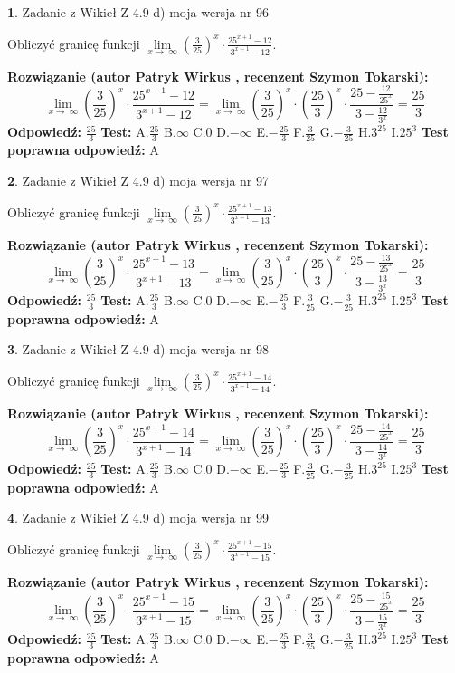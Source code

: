 \documentclass[12pt, a4paper]{article}
\theoremstyle{definition} %
\newtheorem{zad}{}
\newcommand{\zadStart}[1]{\begin{zad}#1\newline}
\newcommand{\zadStop}{\end{zad}}
\newcommand{\rozwStart}[2]{\noindent \textbf{Rozwiązanie (autor #1 , recenzent #2): }\newline}
\newcommand{\rozwStop}{\newline}
\newcommand{\odpStart}{\noindent \textbf{Odpowiedź:}\newline}
\newcommand{\odpStop}{\newline}
\newcommand{\testStart}{\noindent \textbf{Test:}\newline}
\newcommand{\testStop}{\newline}
\newcommand{\kluczStart}{\noindent \textbf{Test poprawna odpowiedź:}\newline}
\newcommand{\kluczStop}{\newline}
\begin{document}
\zadStart{Zadanie z Wikieł Z 4.9 d) moja wersja nr 96}


Obliczyć granicę funkcji  $\lim\limits_{x\to\ \infty}(\frac{3}{25})^{x}\cdot\frac{25^{x+1}-12}{3^{x+1}-12}$.
\zadStop
\rozwStart{Patryk Wirkus}{Szymon Tokarski}
$$\lim\limits_{x\to\ \infty}(\frac{3}{25})^{x}\cdot\frac{25^{x+1}-12}{3^{x+1}-12}=\lim\limits_{x\to\ \infty}(\frac{3}{25})^{x}\cdot(\frac{25}{3})^{x} \cdot \frac{25-\frac{12}{25^{x}}}{3-\frac{12}{3^{x}}} = \frac{25}{3}$$
\rozwStop
\odpStart
$\frac{25}{3}$
\odpStop
\testStart
A.$\frac{25}{3}$ B.$\infty$ C.$0$ D.$-\infty$ E.$-\frac{25}{3}$
F.$\frac{3}{25}$ G.$-\frac{3}{25}$
H.$3^{25}$
I.$25^{3}$
\testStop
\kluczStart
A
\kluczStop



\zadStart{Zadanie z Wikieł Z 4.9 d) moja wersja nr 97}


Obliczyć granicę funkcji  $\lim\limits_{x\to\ \infty}(\frac{3}{25})^{x}\cdot\frac{25^{x+1}-13}{3^{x+1}-13}$.
\zadStop
\rozwStart{Patryk Wirkus}{Szymon Tokarski}
$$\lim\limits_{x\to\ \infty}(\frac{3}{25})^{x}\cdot\frac{25^{x+1}-13}{3^{x+1}-13}=\lim\limits_{x\to\ \infty}(\frac{3}{25})^{x}\cdot(\frac{25}{3})^{x} \cdot \frac{25-\frac{13}{25^{x}}}{3-\frac{13}{3^{x}}} = \frac{25}{3}$$
\rozwStop
\odpStart
$\frac{25}{3}$
\odpStop
\testStart
A.$\frac{25}{3}$ B.$\infty$ C.$0$ D.$-\infty$ E.$-\frac{25}{3}$
F.$\frac{3}{25}$ G.$-\frac{3}{25}$
H.$3^{25}$
I.$25^{3}$
\testStop
\kluczStart
A
\kluczStop



\zadStart{Zadanie z Wikieł Z 4.9 d) moja wersja nr 98}


Obliczyć granicę funkcji  $\lim\limits_{x\to\ \infty}(\frac{3}{25})^{x}\cdot\frac{25^{x+1}-14}{3^{x+1}-14}$.
\zadStop
\rozwStart{Patryk Wirkus}{Szymon Tokarski}
$$\lim\limits_{x\to\ \infty}(\frac{3}{25})^{x}\cdot\frac{25^{x+1}-14}{3^{x+1}-14}=\lim\limits_{x\to\ \infty}(\frac{3}{25})^{x}\cdot(\frac{25}{3})^{x} \cdot \frac{25-\frac{14}{25^{x}}}{3-\frac{14}{3^{x}}} = \frac{25}{3}$$
\rozwStop
\odpStart
$\frac{25}{3}$
\odpStop
\testStart
A.$\frac{25}{3}$ B.$\infty$ C.$0$ D.$-\infty$ E.$-\frac{25}{3}$
F.$\frac{3}{25}$ G.$-\frac{3}{25}$
H.$3^{25}$
I.$25^{3}$
\testStop
\kluczStart
A
\kluczStop



\zadStart{Zadanie z Wikieł Z 4.9 d) moja wersja nr 99}


Obliczyć granicę funkcji  $\lim\limits_{x\to\ \infty}(\frac{3}{25})^{x}\cdot\frac{25^{x+1}-15}{3^{x+1}-15}$.
\zadStop
\rozwStart{Patryk Wirkus}{Szymon Tokarski}
$$\lim\limits_{x\to\ \infty}(\frac{3}{25})^{x}\cdot\frac{25^{x+1}-15}{3^{x+1}-15}=\lim\limits_{x\to\ \infty}(\frac{3}{25})^{x}\cdot(\frac{25}{3})^{x} \cdot \frac{25-\frac{15}{25^{x}}}{3-\frac{15}{3^{x}}} = \frac{25}{3}$$
\rozwStop
\odpStart
$\frac{25}{3}$
\odpStop
\testStart
A.$\frac{25}{3}$ B.$\infty$ C.$0$ D.$-\infty$ E.$-\frac{25}{3}$
F.$\frac{3}{25}$ G.$-\frac{3}{25}$
H.$3^{25}$
I.$25^{3}$
\testStop
\kluczStart
A
\kluczStop
\end{document}
